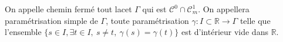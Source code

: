 \begin{definition}
    On appelle chemin fermé tout lacet $\Gamma$ qui est $\mathcal{C}^0\cap\mathcal{C}^1_m$. On appellera paramétrisation simple de $\Gamma$, toute paramétrisation $\gamma : I\subset\mathbb{R}\longrightarrow\Gamma$ telle que l’ensemble $\{s\in I, \exists t\in I,~s\neq t,~ \gamma(s) = \gamma(t)\}$ est d’intérieur vide dans $\mathbb{R}$.
\end{definition}


